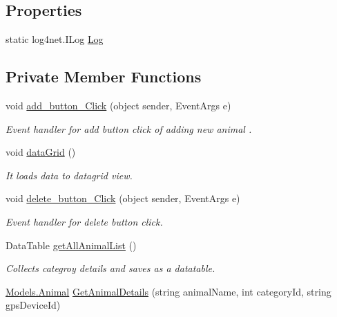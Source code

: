 \subsection*{Properties}
\begin{DoxyCompactItemize}
\item 
static log4net.\+I\+Log \hyperlink{classWildlifeTrackingApp_1_1GPSDevice_a5fc9abb86e6110ecd61d0a1a7d740a8a}{Log}
\end{DoxyCompactItemize}
\subsection*{Private Member Functions}
\begin{DoxyCompactItemize}
\item 
void \hyperlink{classWildlifeTrackingApp_1_1GPSDevice_ae56b21bee08f5cad9858a264ccc21fd5}{add\+\_\+button\+\_\+\+Click} (object sender, Event\+Args e)
\begin{DoxyCompactList}\small\item\em Event handler for add button click of adding new animal . \end{DoxyCompactList}\item 
void \hyperlink{classWildlifeTrackingApp_1_1GPSDevice_af87e0d54e9971bfe9ccba3a85841f619}{data\+Grid} ()
\begin{DoxyCompactList}\small\item\em It loads data to datagrid view. \end{DoxyCompactList}\item 
void \hyperlink{classWildlifeTrackingApp_1_1GPSDevice_a28f46cdb401c2c8da3f8e117eaedf977}{delete\+\_\+button\+\_\+\+Click} (object sender, Event\+Args e)
\begin{DoxyCompactList}\small\item\em Event handler for delete button click. \end{DoxyCompactList}\item 
Data\+Table \hyperlink{classWildlifeTrackingApp_1_1GPSDevice_a72673ff63cce544357c7d37b7277d2a9}{get\+All\+Animal\+List} ()
\begin{DoxyCompactList}\small\item\em Collects categroy details and saves as a datatable. \end{DoxyCompactList}\item 
\hyperlink{classWildlifeTrackingApp_1_1Models_1_1Animal}{Models.\+Animal} \hyperlink{classWildlifeTrackingApp_1_1GPSDevice_aa77ac6fe5337cfc839398bafce2995c9}{Get\+Animal\+Details} (string animal\+Name, int category\+Id, string gps\+Device\+Id)

\end{DoxyCompactItemize}
